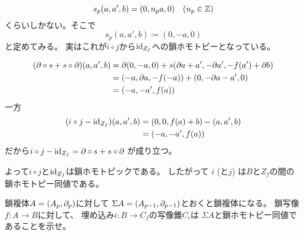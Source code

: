 \documentclass[report]{jlreq}
\begin{document}
\begin{answer}
    \begin{equation}
        s_p(a, a', b) = (0, n_p a, 0)
            \quad (n_p \in \mathbb{Z})
    \end{equation}
    くらいしかない。そこで
    \begin{equation}
        s_p(a, a', b) \coloneqq (0, -a, 0)
    \end{equation}
    と定めてみる。
    実はこれが$i \circ j$から$\mathrm{id}_{Z_f}$への鎖ホモトピーとなっている。
    \begin{innerproof}
        \begin{alignat}{1}
            (\partial \circ s + s \circ \partial)(a, a', b)
                &= \partial (0, -a, 0)
                    + s(\partial a + a', - \partial a', - f(a') + \partial b) \\
                &= (-a, \partial a, - f(-a)) + (0, - \partial a - a', 0) \\
                &= (-a, -a', f(a)) \\
        \end{alignat}
        一方
        \begin{alignat}{1}
            (i \circ j - \mathrm{id}_{Z_f})(a, a', b)
                &= (0, 0, f(a) + b) - (a, a', b) \\
                &= (-a, -a', f(a))
        \end{alignat}
        だから$i \circ j - \mathrm{id}_{Z_f} = \partial \circ s + s \circ \partial$
        が成り立つ。
    \end{innerproof}
    よって$i \circ j$と$\mathrm{id}_{Z_f}$は鎖ホモトピックである。
    したがって
    $i$ (と$j$) は$B$と$Z_f$の間の鎖ホモトピー同値である。
\end{answer}

\begin{problem}
    鎖複体$A = (A_p, \partial_p)$に対して
    $\Sigma A = (A_{p - 1}, \partial_{p - 1})$とおくと鎖複体になる。
    鎖写像$f \colon A \to B$に対して、
    埋め込み$i \colon B \to C_f$の写像錐$C_i$は
    $\Sigma A$と鎖ホモトピー同値であることを示せ。
\end{problem}
\end{document}
